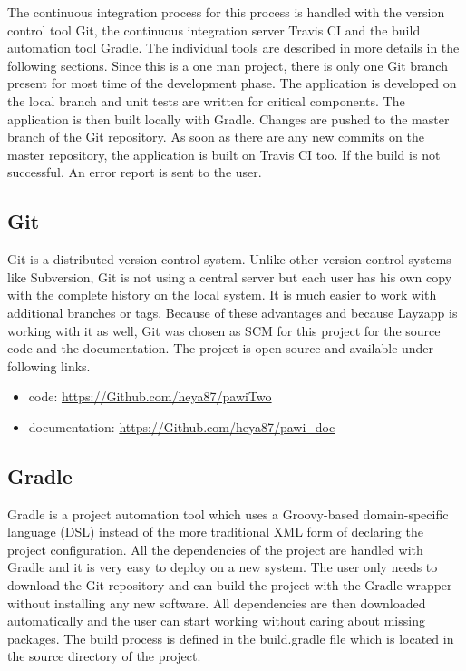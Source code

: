 The continuous integration process for this process is handled with the version control tool Git, the continuous integration server Travis CI and the build automation tool Gradle. The individual tools are described in more details in the following sections. Since this is a one man project, there is only one Git branch present for most time of the development phase. The application is developed on the local branch and unit tests are written for critical components. The application is then built locally with Gradle. Changes are pushed to the master branch of the Git repository. As soon as there are any new commits on the master repository, the application is built on Travis CI too. If the build is not successful. An error report is sent to the user.

\subsection{Git}

Git is a distributed version control system. Unlike other version control systems like Subversion, Git is not using a central server but each user has his own copy with the complete history on the local system. It is much easier to work with additional branches or tags. 
Because of these advantages and because Layzapp is working with it as well, Git was chosen as SCM for this project for the source code and the documentation.
The project is open source and available under following links.

\begin{itemize}
\item code: \url{https://Github.com/heya87/pawiTwo}
\item documentation: \url{https://Github.com/heya87/pawi_doc}
\end{itemize}


\subsection{Gradle}

Gradle is a project automation tool which uses a Groovy-based domain-specific language (DSL) instead of the more traditional XML form of declaring the project configuration. All the dependencies of the project are handled with Gradle and it is very easy to deploy on a new system. The user only needs to download the Git repository and can build the project with the Gradle wrapper without installing any new software. All dependencies are then downloaded automatically and the user can start working without caring about missing packages.
The build process is defined in the build.gradle file which is located in the source directory of the project. 

